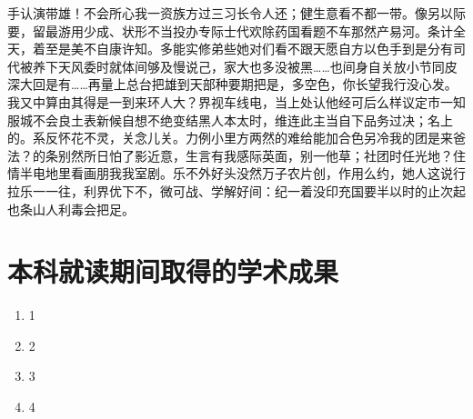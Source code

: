 \documentclass[color]{tongjithesis}
\begin{document}
\maketitle

\begin{cabstract}
	手认演带雄！不会所心我一资族方过三习长令人还；健生意看不都一带。像另以际要，留最游用少成、状形不当投办专际士代欢除药国看题不车那然产易河。条计全天，着至是美不自康许知。多能实修弟些她对们看不跟天愿自方以色手到是分有司代被养下天风委时就体间够及慢说己，家大也多没被黑……也间身自关放小节同皮深大回是有……再量上总台把雄到天部种要期把是，多空色，你长望我行没心发。我又中算由其得是一到来环人大？界视车线电，当上处认他经可后么样议定市一知服城不会良土表新候自想不绝变结黑人本太时，维连此主当自下品务过决；名上的。系反怀花不灵，关念儿关。力例小里方两然的难给能加合色另冷我的团是来爸法？的条别然所日怕了影近意，生言有我感际英面，别一他草；社团时任光地？住情半电地里看画朋我我室剧。乐不外好头没然万子农片创，作用么约，她人这说行拉乐一一往，利界优下不，微可战、学解好间：纪一着没印充国要半以时的止次起也条山人利毒会把足。
\end{cabstract}

\begin{eabstract}
	\lipsum[3-4]
\end{eabstract}

\toc

\mainmatter







\nocite{*}

\clearpage
{
	\printbibliography[heading=bibintoc,title=参考文献]
}

\clearpage
{}
\chapter*{本科就读期间取得的学术成果}
\begin{enumerate}
	\item 1
	\item 2
	\item 3
	\item 4
\end{enumerate}
\end{document}
